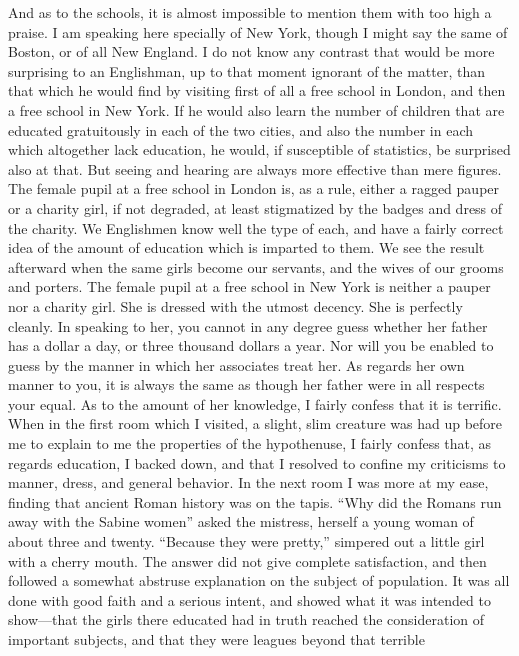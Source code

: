 And as to the schools, it is almost impossible to mention them with
too high a praise.  I am speaking here specially of New York,
though I might say the same of Boston, or of all New England.  I do
not know any contrast that would be more surprising to an
Englishman, up to that moment ignorant of the matter, than that
which he would find by visiting first of all a free school in
London, and then a free school in New York.  If he would also learn
the number of children that are educated gratuitously in each of
the two cities, and also the number in each which altogether lack
education, he would, if susceptible of statistics, be surprised
also at that.  But seeing and hearing are always more effective
than mere figures.  The female pupil at a free school in London is,
as a rule, either a ragged pauper or a charity girl, if not
degraded, at least stigmatized by the badges and dress of the
charity.  We Englishmen know well the type of each, and have a
fairly correct idea of the amount of education which is imparted to
them.  We see the result afterward when the same girls become our
servants, and the wives of our grooms and porters.  The female
pupil at a free school in New York is neither a pauper nor a
charity girl.  She is dressed with the utmost decency.  She is
perfectly cleanly.  In speaking to her, you cannot in any degree
guess whether her father has a dollar a day, or three thousand
dollars a year.  Nor will you be enabled to guess by the manner in
which her associates treat her.  As regards her own manner to you,
it is always the same as though her father were in all respects
your equal.  As to the amount of her knowledge, I fairly confess
that it is terrific.  When in the first room which I visited, a
slight, slim creature was had up before me to explain to me the
properties of the hypothenuse, I fairly confess that, as regards
education, I backed down, and that I resolved to confine my
criticisms to manner, dress, and general behavior.  In the next
room I was more at my ease, finding that ancient Roman history was
on the tapis.  ``Why did the Romans run away with the Sabine women''
asked the mistress, herself a young woman of about three and
twenty.  ``Because they were pretty,'' simpered out a little girl
with a cherry mouth.  The answer did not give complete
satisfaction, and then followed a somewhat abstruse explanation on
the subject of population.  It was all done with good faith and a
serious intent, and showed what it was intended to show---that the
girls there educated had in truth reached the consideration of
important subjects, and that they were leagues beyond that terrible
